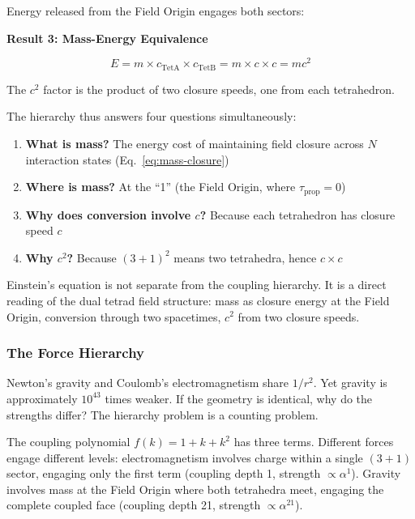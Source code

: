 \documentclass[aps,prd,preprint,superscriptaddress,showpacs,preprintnumbers,amsmath,amssymb,nofootinbib]{revtex4-2}
\begin{document}
Energy released from the Field Origin engages both sectors:

\vspace{1.5em}
\noindent
\colorbox{resultgreen}{\parbox{\dimexpr\textwidth-2\fboxsep\relax}{%
\vspace{0.8em}
\centering
\textbf{\large Result 3: Mass-Energy Equivalence}

\vspace{0.5em}
\boldmath
\begin{equation}
E = m \times c_{\text{TetA}} \times c_{\text{TetB}} = m \times c \times c = mc^2
\end{equation}
\unboldmath

\vspace{0.3em}
The $c^2$ factor is the product of two closure speeds, one from each tetrahedron.
\vspace{0.5em}
}}
\vspace{1cm}

The hierarchy thus answers four questions simultaneously:
\begin{enumerate}
\item \textbf{What is mass?} The energy cost of maintaining field closure across $N$ interaction states (Eq.~\ref{eq:mass-closure})
\item \textbf{Where is mass?} At the ``1'' (the Field Origin, where $\tau_{\text{prop}} = 0$)
\item \textbf{Why does conversion involve $c$?} Because each tetrahedron has closure speed $c$
\item \textbf{Why $c^2$?} Because $(3+1)^2$ means two tetrahedra, hence $c \times c$
\end{enumerate}

Einstein's equation is not separate from the coupling hierarchy. It is a direct reading of the dual tetrad field structure: mass as closure energy at the Field Origin, conversion through two spacetimes, $c^2$ from two closure speeds.

\subsubsection*{The Force Hierarchy}

Newton's gravity and Coulomb's electromagnetism share $1/r^2$. Yet gravity is approximately $10^{43}$ times weaker. If the geometry is identical, why do the strengths differ? The hierarchy problem is a counting problem.

The coupling polynomial $f(k) = 1 + k + k^2$ has three terms. Different forces engage different levels: electromagnetism involves charge within a single $(3{+}1)$ sector, engaging only the first term (coupling depth 1, strength $\propto \alpha^1$). Gravity involves mass at the Field Origin where both tetrahedra meet, engaging the complete coupled face (coupling depth 21, strength $\propto \alpha^{21}$).
\end{document}
